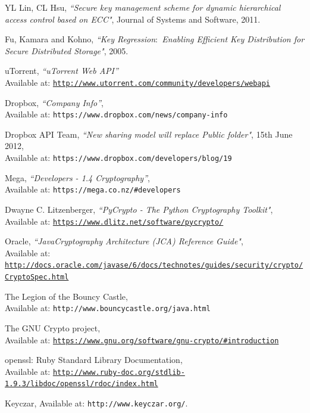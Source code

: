 \documentclass[12pt, titlepage]{article}
\begin{document}
\begin{thebibliography}{10}
YL Lin, CL Hsu, \emph{``Secure key management scheme for dynamic hierarchical access control based on ECC"}, Journal of Systems and Software, 2011.

Fu, Kamara and Kohno, \emph{``Key Regression$\colon$ Enabling Efficient Key Distribution for Secure Distributed Storage"}, 2005.

uTorrent, \emph{``uTorrent Web API''}
\\ Available at: \texttt{\url{http://www.utorrent.com/community/developers/webapi}}

Dropbox, \emph{``Company Info''},
\\ Available at: \texttt{https://www.dropbox.com/news/company-info}

Dropbox API Team, \emph{``New sharing model will replace Public folder"},  15th June 2012,
\\ Available at: \texttt{https://www.dropbox.com/developers/blog/19}

Mega, \emph{``Developers - 1.4 Cryptography''},
\\ Available at: \texttt{https://mega.co.nz/\#developers}

Dwayne C. Litzenberger, \emph{``PyCrypto - The Python Cryptography Toolkit"},
\\ Available at: \texttt{\url{https://www.dlitz.net/software/pycrypto/}}

Oracle, \emph{``Java\texttrademark Cryptography Architecture (JCA) Reference Guide"},
\\ Available at: \texttt{\url{http://docs.oracle.com/javase/6/docs/technotes/guides/security/crypto/CryptoSpec.html}}

The Legion of the Bouncy Castle,
\\ Available at: \texttt{http://www.bouncycastle.org/java.html}

The GNU Crypto project,
\\ Available at: \texttt{\url{https://www.gnu.org/software/gnu-crypto/\#introduction}}

openssl: Ruby Standard Library Documentation,
\\ Available at: \texttt{\url{http://www.ruby-doc.org/stdlib-1.9.3/libdoc/openssl/rdoc/index.html}}

Keyczar, Available at: \texttt{http://www.keyczar.org/}.


\end{thebibliography}
\end{document}
